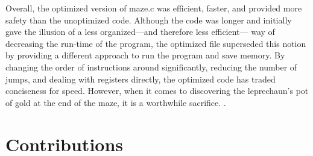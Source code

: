 \documentclass[12pt,letterpaper]{article}
\begin{document}
Overall, the optimized version of maze.c was efficient, faster, and provided 
more safety than the unoptimized code. Although the code was longer and 
initially gave the illusion of a less organized---and therefore less efficient---
way of decreasing the run-time of the program, the optimized file superseded 
this notion by providing a different approach to run the program and save memory.
By changing the order of instructions around significantly, reducing the number of 
jumps, and dealing with registers directly, the optimized code has traded conciseness 
for speed. However, when it comes to discovering the leprechaun's pot of gold at 
the end of the maze, it is a worthwhile sacrifice. 
\newpage
\appendix .
\appendixpage
\section{Contributions}
\end{document}
